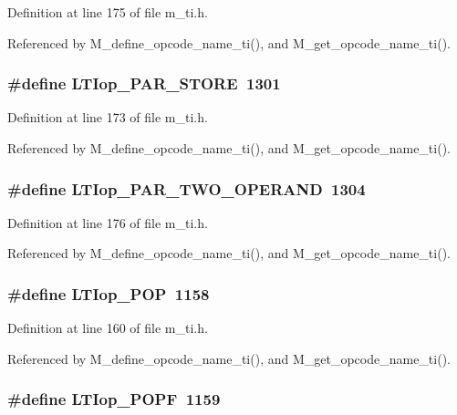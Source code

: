 Definition at line 175 of file m\_\-ti.h.

Referenced by M\_\-define\_\-opcode\_\-name\_\-ti(), and M\_\-get\_\-opcode\_\-name\_\-ti().
\subsubsection{\setlength{\rightskip}{0pt plus 5cm}\#define LTIop\_\-PAR\_\-STORE~1301}\label{m__ti_8h_831d19c88d1aec5589afc113fa52cfbd}




Definition at line 173 of file m\_\-ti.h.

Referenced by M\_\-define\_\-opcode\_\-name\_\-ti(), and M\_\-get\_\-opcode\_\-name\_\-ti().
\subsubsection{\setlength{\rightskip}{0pt plus 5cm}\#define LTIop\_\-PAR\_\-TWO\_\-OPERAND~1304}\label{m__ti_8h_4d26dec053157708dfd1fd82f0c3a1c8}




Definition at line 176 of file m\_\-ti.h.

Referenced by M\_\-define\_\-opcode\_\-name\_\-ti(), and M\_\-get\_\-opcode\_\-name\_\-ti().
\subsubsection{\setlength{\rightskip}{0pt plus 5cm}\#define LTIop\_\-POP~1158}\label{m__ti_8h_afc361fce5830d1f5052ad4bf9436833}




Definition at line 160 of file m\_\-ti.h.

Referenced by M\_\-define\_\-opcode\_\-name\_\-ti(), and M\_\-get\_\-opcode\_\-name\_\-ti().
\subsubsection{\setlength{\rightskip}{0pt plus 5cm}\#define LTIop\_\-POPF~1159}\label{m__ti_8h_df196082435ca042d94db7a7ad3b9a7e}




